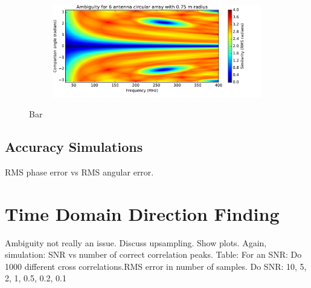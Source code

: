 \begin{figure}
\begin{subfigure}{\textwidth}
    \centering
    \includegraphics[width=\textwidth, clip=true, trim = 0 15 50 0]{ambiguity03}
  \end{subfigure}
  \caption{Bar}
\end{figure}

\subsection{Accuracy Simulations}
RMS phase error vs RMS angular error.

\section{Time Domain Direction Finding}
Ambiguity not really an issue.
Discuss upsampling. Show plots.
Again, simulation:
SNR vs number of correct correlation peaks.
Table: 
For an SNR: Do 1000 different cross correlations.RMS error in number of samples.
Do SNR: 10, 5, 2, 1, 0.5, 0.2, 0.1
